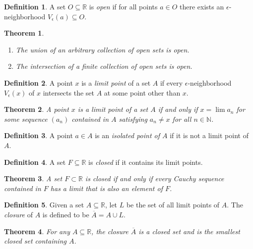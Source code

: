 \documentclass{amsart}
\newtheorem*{theorem}{Theorem}
\theoremstyle{definition}
\newtheorem*{definition}{Definition}
\newcommand{\N}{\mathbb{N}}
\newcommand{\R}{\mathbb{R}}
\begin{document}
\begin{definition}
  A set $O \subseteq \R$ is \emph{open} if for all points $a \in O$ there exists
  an $\epsilon$-neighborhood $V_\epsilon(a) \subseteq O$.
\end{definition}

\begin{theorem}
  \begin{enumerate}[label={(\roman*)}]
    \item The union of an arbitrary collection of open sets is open.
    \item The intersection of a finite collection of open sets is open.
  \end{enumerate}
\end{theorem}

\begin{definition}
  A point $x$ is a \emph{limit point} of a set $A$ if every
  $\epsilon$-neighborhood $V_\epsilon(x)$ of $x$ intersects the set $A$ at some
  point other than $x$.
\end{definition}

\begin{theorem}
  A point $x$ is a limit point of a set $A$ if and only if $x = \lim a_n$ for
  some sequence $(a_n)$ contained in $A$ satisfying $a_n \neq x$ for all $n \in
  \N$.
\end{theorem}

\begin{definition}
  A point $a \in A$ is an \emph{isolated point of $A$} if it is not a limit
  point of $A$.
\end{definition}

\begin{definition}
  A set $F \subseteq \R$ is \emph{closed} if it contains its limit points.
\end{definition}

\begin{theorem}
  A set $F \subset \R$ is closed if and only if every Cauchy sequence contained
  in $F$ has a limit that is also an element of $F$.
\end{theorem}

\begin{definition}
  Given a set $A \subseteq \R$, let $L$ be the set of all limit points of $A$.
  The \emph{closure} of $A$ is defined to be $\overline{A} = A \cup L$.
\end{definition}

\begin{theorem}
  For any $A \subseteq \R$, the closure $\overline{A}$ is a closed set and is the
  smallest closed set containing $A$.
\end{theorem}
\end{document}
